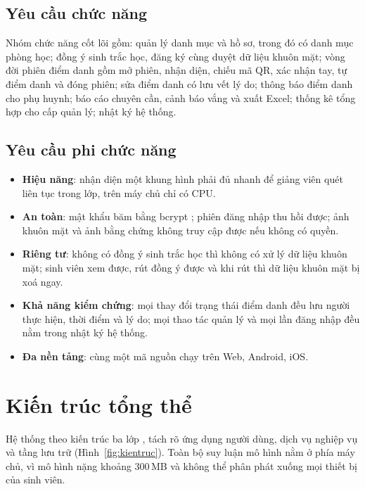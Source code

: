 \subsection{Yêu cầu chức năng}

Nhóm chức năng cốt lõi gồm: quản lý danh mục và hồ sơ, trong đó có danh mục
phòng học; đồng ý sinh trắc học, đăng ký cùng duyệt dữ liệu khuôn mặt; vòng
đời phiên điểm danh gồm mở phiên, nhận diện, chiếu mã QR, xác nhận tay, tự
điểm danh và đóng phiên; sửa điểm danh có lưu vết lý do; thông báo điểm danh
cho phụ huynh; báo cáo chuyên cần, cảnh báo vắng và xuất Excel; thống kê tổng
hợp cho cấp quản lý; nhật ký hệ thống.

\subsection{Yêu cầu phi chức năng}

\begin{itemize}[leftmargin=1.6em, itemsep=2pt]
  \item \textbf{Hiệu năng}: nhận diện một khung hình phải đủ nhanh để giảng
        viên quét liên tục trong lớp, trên máy chủ chỉ có CPU.
  \item \textbf{An toàn}: mật khẩu băm bằng bcrypt \cite{Provos1999Bcrypt}; phiên đăng nhập thu hồi
        được; ảnh khuôn mặt và ảnh bằng chứng không truy cập được nếu không
        có quyền.
  \item \textbf{Riêng tư}: không có đồng ý sinh trắc học thì không có xử lý
        dữ liệu khuôn mặt; sinh viên xem được, rút đồng ý được và khi rút thì
        dữ liệu khuôn mặt bị xoá ngay.
  \item \textbf{Khả năng kiểm chứng}: mọi thay đổi trạng thái điểm danh đều
        lưu người thực hiện, thời điểm và lý do; mọi thao tác quản lý và mọi
        lần đăng nhập đều nằm trong nhật ký hệ thống.
  \item \textbf{Đa nền tảng}: cùng một mã nguồn chạy trên Web, Android, iOS.
\end{itemize}

\section{Kiến trúc tổng thể}

Hệ thống theo kiến trúc ba lớp \cite{Fowler2002PoEAA}, tách rõ ứng dụng người dùng, dịch vụ nghiệp
vụ và tầng lưu trữ (Hình~\ref{fig:kientruc}). Toàn bộ suy luận mô hình nằm ở
phía máy chủ, vì mô hình nặng khoảng 300\,MB và không thể phân phát xuống mọi
thiết bị của sinh viên.

